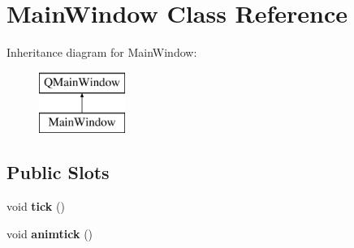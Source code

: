 \hypertarget{class_main_window}{}\section{Main\+Window Class Reference}
\label{class_main_window}
Inheritance diagram for Main\+Window\+:\begin{figure}[H]
\begin{center}
\leavevmode
\includegraphics[height=2.000000cm]{class_main_window}
\end{center}
\end{figure}
\subsection*{Public Slots}
\begin{DoxyCompactItemize}
\item 
\hypertarget{class_main_window_a48965b8c40edf53d61e2d41977c1566d}{}void {\bfseries tick} ()\label{class_main_window_a48965b8c40edf53d61e2d41977c1566d}

\item 
\hypertarget{class_main_window_a514afc31453a4560a530a96975d31727}{}void {\bfseries animtick} ()\label{class_main_window_a514afc31453a4560a530a96975d31727}

\end{DoxyCompactItemize}
